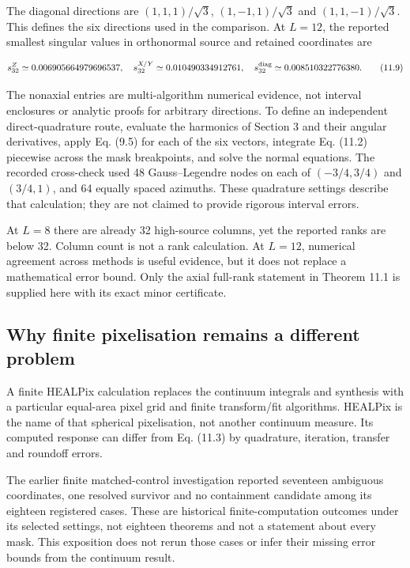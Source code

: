 \documentclass[
  11pt,
  a4paper]{article}
\begin{document}
The diagonal directions are \((1,1,1)/\sqrt3\), \((1,-1,1)/\sqrt3\) and \((1,1,-1)/\sqrt3\). This defines the six directions used in the comparison. At \(L=12\), the reported smallest singular values in orthonormal source and retained coordinates are

\[
s_{32}^{Z}\simeq0.006905664979696537,
\quad s_{32}^{X/Y}\simeq0.010490334912761,
\quad s_{32}^{\rm diag}\simeq0.008510322776380.
\tag{11.9}
\]

The nonaxial entries are multi-algorithm numerical evidence, not interval enclosures or analytic proofs for arbitrary directions. To define an independent direct-quadrature route, evaluate the harmonics of Section 3 and their angular derivatives, apply Eq. (9.5) for each of the six vectors, integrate Eq. (11.2) piecewise across the mask breakpoints, and solve the normal equations. The recorded cross-check used 48 Gauss--Legendre nodes on each of \((-3/4,3/4)\) and \((3/4,1)\), and 64 equally spaced azimuths. These quadrature settings describe that calculation; they are not claimed to provide rigorous interval errors.

At \(L=8\) there are already 32 high-source columns, yet the reported ranks are below 32. Column count is not a rank calculation. At \(L=12\), numerical agreement across methods is useful evidence, but it does not replace a mathematical error bound. Only the axial full-rank statement in Theorem 11.1 is supplied here with its exact minor certificate.

\hypertarget{why-finite-pixelisation-remains-a-different-problem}{%
\subsection{Why finite pixelisation remains a different problem}\label{why-finite-pixelisation-remains-a-different-problem}}

A finite HEALPix calculation replaces the continuum integrals and synthesis with a particular equal-area pixel grid and finite transform/fit algorithms. HEALPix is the name of that spherical pixelisation, not another continuum measure. Its computed response can differ from Eq. (11.3) by quadrature, iteration, transfer and roundoff errors.

The earlier finite matched-control investigation reported seventeen ambiguous coordinates, one resolved survivor and no containment candidate among its eighteen registered cases. These are historical finite-computation outcomes under its selected settings, not eighteen theorems and not a statement about every mask. This exposition does not rerun those cases or infer their missing error bounds from the continuum result.
\end{document}
